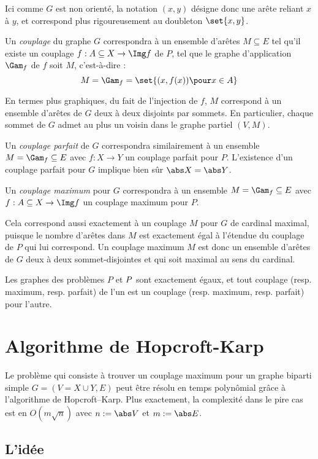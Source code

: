  Ici comme $G$ est non orienté, la notation $(x,y)$ désigne donc une arête reliant $x$ à $y$, et correspond plus rigoureusement au doubleton $\set{x,y}$.
 
 Un \emph{couplage} du graphe $G$ correspondra à un ensemble d'arêtes $M \subseteq E$ tel qu'il existe un couplage $f : A \subseteq X \to \Img f$ de $P$, tel que le graphe d'application $\Gam_f$ de $f$ soit $M$, c'est-à-dire :
 \[ M = \Gam_f = \set{ (x,f(x)) \pour x \in A } \]
 
 En termes plus graphiques, du fait de l'injection de $f$, $M$ correspond à un ensemble d'arêtes de $G$ deux à deux disjoints par sommets. En particulier, chaque sommet de $G$ admet au plus un voisin dans le graphe partiel $(V, M)$.
 
 Un \emph{couplage parfait} de $G$ correspondra similairement à un ensemble $M = \Gam_f \subseteq E$ avec $f : X \to Y$ un couplage parfait pour $P$. L'existence d'un couplage parfait pour $G$ implique bien sûr $\abs X = \abs Y$.
 
 Un \emph{couplage maximum} pour $G$ correspondra à un ensemble $M = \Gam_f \subseteq E$ avec $f : A \subseteq X \to \Img f$ un couplage maximum pour $P$.
 
 Cela correspond aussi exactement à un couplage $M$ pour $G$ de cardinal maximal, puisque le nombre d'arêtes dans $M$ est exactement égal à l'étendue du couplage de $P$ qui lui correspond. Un couplage maximum $M$ est donc un ensemble d'arêtes de $G$ deux à deux sommet-disjointes et qui soit maximal au sens du cardinal.
 \SEP
 
 Les graphes des problèmes $P$ et $P\-$ sont exactement égaux, et tout couplage (resp. maximum, resp. parfait) de l'un est un couplage (resp. maximum, resp. parfait) pour l'autre.
 
 \section{Algorithme de Hopcroft-Karp}
 
 Le problème qui consiste à trouver un couplage maximum pour un graphe biparti simple $G = (V = X \cup Y,E)$ peut être résolu en temps polynômial grâce à l'algorithme de Hopcroft–Karp. Plus exactement, la complexité dans le pire cas est en $O(m \sqrt n)$ avec $n := \abs V$ et $m := \abs E$.
 
 \subsection{L'idée}
 
